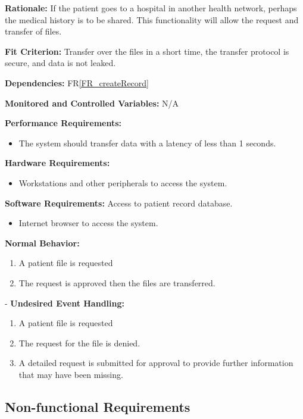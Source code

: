 \documentclass[12pt]{article}
\begin{document}
\begin{itemize}
\textbf{Rationale:} If the patient goes to a hospital in another health network, perhaps the medical history is to be shared. This functionality will allow the request and transfer of files.

\textbf{Fit Criterion:} Transfer over the files in a short time, the transfer protocol is secure, and data is not leaked.

\textbf{Dependencies:} FR\ref{FR_createRecord}

\textbf{Monitored and Controlled Variables:} N/A

\textbf{Performance Requirements:}
\begin{itemize}
  \item The system should transfer data with a latency of less than 1 seconds.
\end{itemize}

\textbf{Hardware Requirements:} 
\begin{itemize}
  \item Workstations and other peripherals to access the system.
\end{itemize}

\textbf{Software Requirements:}
Access to patient record database.
\begin{itemize}
  \item Internet browser to access the system. 
\end{itemize}

\textbf{Normal Behavior:}
\begin{enumerate}
  \item A patient file is requested
  \item The request is approved then the files are transferred.
\end{enumerate}
-
\textbf{Undesired Event Handling:}
\begin{enumerate}
  \item A patient file is requested 
  \item The request for the file is denied. 
  \item A detailed request is submitted for approval to provide further information that may have been missing.
\end{enumerate}
\end{itemize}
\subsection{Non-functional Requirements} \label{sec_NonFunctionalRequirements}
\end{document}
